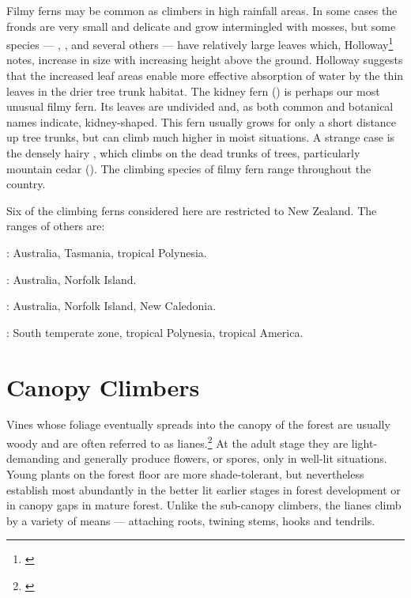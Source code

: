 Filmy ferns may be common as climbers in high rainfall areas.
In some cases the fronds are very small and delicate and grow intermingled with mosses, but some species --- , ,  and several others --- have relatively large leaves which, Holloway\footnote{\cite{holloway1923studies}} notes, increase in size with increasing height above the ground.
Holloway suggests that the increased leaf areas enable more effective absorption of water by the thin leaves in the drier tree trunk habitat.
The kidney fern () is perhaps our most unusual filmy fern.
Its leaves are undivided and, as both common and botanical names indicate, kidney-shaped.
This fern usually grows for only a short distance up tree trunks, but can climb much higher in moist situations.
A strange case is the densely hairy , which climbs on the dead trunks of trees, particularly mountain cedar ().
The climbing species of filmy fern range throughout the country.

Six of the climbing ferns considered here are restricted to New Zealand.
The ranges of others are:

: Australia, Tasmania, tropical Polynesia.

: Australia, Norfolk Island.

: Australia, Norfolk Island, New Caledonia.

: South temperate zone, tropical Polynesia, tropical America.

\section{Canopy Climbers}

Vines whose foliage eventually spreads into the canopy of the forest are usually woody and are often referred to as lianes.\footnote{\cite{bird1916observations}}
At the adult stage they are light-demanding and generally produce flowers, or spores, only in well-lit situations.
Young plants on the forest floor are more shade-tolerant, but nevertheless establish most abundantly in the better lit earlier stages in forest development or in canopy gaps in mature forest.
Unlike the sub-canopy climbers, the lianes climb by a variety of means --- attaching roots, twining stems, hooks and tendrils.

